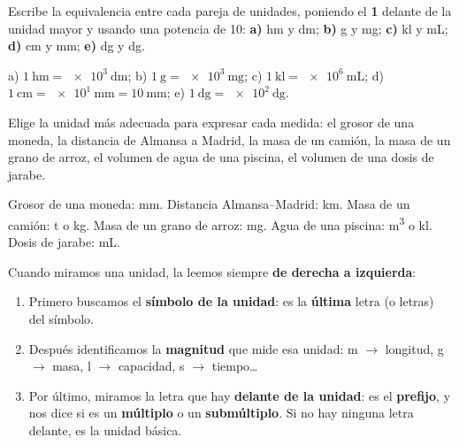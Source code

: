 \begin{exercise}
    Escribe la equivalencia entre cada pareja de unidades, poniendo el \textbf{1} delante de la unidad mayor y usando una potencia de 10: \textbf{a)} \unit{\hecto\m} y \unit{\dm}; \textbf{b)} \unit{\g} y \unit{\mg}; \textbf{c)} \unit{\kilo\litre} y \unit{\mL}; \textbf{d)} \unit{\cm} y \unit{\mm}; \textbf{e)} \unit{\deca\gram} y \unit{\deci\gram}.
    \begin{solu}
        a) \(\qty{1}{\hecto\m} = \qty{e3}{\dm}\); b) \(\qty{1}{\g} = \qty{e3}{\mg}\); c) \(\qty{1}{\kilo\litre} = \qty{e6}{\mL}\); d) \(\qty{1}{\cm} = \qty{e1}{\mm} = \qty{10}{\mm}\); e) \(\qty{1}{\deca\gram} = \qty{e2}{\deci\gram}\).
    \end{solu}
\end{exercise}

\begin{exercise}
    Elige la unidad más adecuada para expresar cada medida: el grosor de una moneda, la distancia de Almansa a Madrid, la masa de un camión, la masa de un grano de arroz, el volumen de agua de una piscina, el volumen de una dosis de jarabe.
    \begin{solu}
        Grosor de una moneda: \unit{\mm}. Distancia Almansa--Madrid: \unit{\km}. Masa de un camión: \unit{\tonne} o \unit{\kg}. Masa de un grano de arroz: \unit{\mg}. Agua de una piscina: \unit{\cubic\m} o \unit{\kilo\litre}. Dosis de jarabe: \unit{\mL}.
    \end{solu}
\end{exercise}

\begin{impt}

    Cuando miramos una unidad, la leemos siempre \textbf{de derecha a izquierda}:
    \begin{enumerate}[label=\numberballmDarkTeal]
        \item Primero buscamos el \textbf{símbolo de la unidad}: es la \textbf{última} letra (o letras) del símbolo.
        \item Después identificamos la \textbf{magnitud} que mide esa unidad: \unit{\m} \(\to\) longitud, \unit{\g} \(\to\) masa, \unit{\litre} \(\to\) capacidad, \unit{\s} \(\to\) tiempo\ldots
        \item Por último, miramos la letra que hay \textbf{delante de la unidad}: es el \textbf{prefijo}, y nos dice si es un \textbf{múltiplo} o un \textbf{submúltiplo}. Si no hay ninguna letra delante, es la unidad básica.
    \end{enumerate}
\end{impt}


